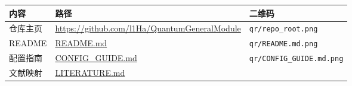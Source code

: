 \documentclass[
]{ctexbook}
\begin{document}
\begin{longtable}[]{@{}lll@{}}
\toprule
\begin{minipage}[b]{0.30\columnwidth}\raggedright
内容\strut
\end{minipage} & \begin{minipage}[b]{0.30\columnwidth}\raggedright
路径\strut
\end{minipage} & \begin{minipage}[b]{0.30\columnwidth}\raggedright
二维码\strut
\end{minipage}\tabularnewline
\midrule
\endhead
\begin{minipage}[t]{0.30\columnwidth}\raggedright
仓库主页\strut
\end{minipage} & \begin{minipage}[t]{0.30\columnwidth}\raggedright
\url{https://github.com/l1Ha/QuantumGeneralModule}\strut
\end{minipage} & \begin{minipage}[t]{0.30\columnwidth}\raggedright
\texttt{qr/repo\_root.png}\strut
\end{minipage}\tabularnewline
\begin{minipage}[t]{0.30\columnwidth}\raggedright
README\strut
\end{minipage} & \begin{minipage}[t]{0.30\columnwidth}\raggedright
\href{https://github.com/l1Ha/QuantumGeneralModule/blob/main/README.md}{README.md}\strut
\end{minipage} & \begin{minipage}[t]{0.30\columnwidth}\raggedright
\texttt{qr/README.md.png}\strut
\end{minipage}\tabularnewline
\begin{minipage}[t]{0.30\columnwidth}\raggedright
配置指南\strut
\end{minipage} & \begin{minipage}[t]{0.30\columnwidth}\raggedright
\href{https://github.com/l1Ha/QuantumGeneralModule/blob/main/CONFIG_GUIDE.md}{CONFIG\_GUIDE.md}\strut
\end{minipage} & \begin{minipage}[t]{0.30\columnwidth}\raggedright
\texttt{qr/CONFIG\_GUIDE.md.png}\strut
\end{minipage}\tabularnewline
\begin{minipage}[t]{0.30\columnwidth}\raggedright
文献映射\strut
\end{minipage} & \begin{minipage}[t]{0.30\columnwidth}\raggedright
\href{https://github.com/l1Ha/QuantumGeneralModule/blob/main/LITERATURE.md}{LITERATURE.md}\strut

\end{minipage}
\end{longtable}
\end{document}
